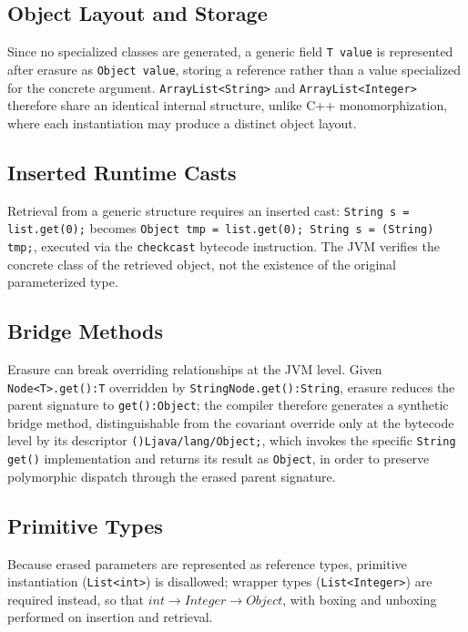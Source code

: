\documentclass[11pt]{report}
\begin{document}
\subsection{Object Layout and Storage}

Since no specialized classes are generated, a generic field \texttt{T value}
is represented after erasure as \texttt{Object value}, storing a reference
rather than a value specialized for the concrete argument.
\texttt{ArrayList<String>} and \texttt{ArrayList<Integer>} therefore share
an identical internal structure, unlike C++ monomorphization, where each
instantiation may produce a distinct object layout.

\subsection{Inserted Runtime Casts}

Retrieval from a generic structure requires an inserted cast:
\texttt{String s = list.get(0);} becomes \texttt{Object tmp = list.get(0);
String s = (String) tmp;}, executed via the \texttt{checkcast} bytecode
instruction. The JVM verifies the concrete class of the retrieved object,
not the existence of the original parameterized type.

\subsection{Bridge Methods}
\label{JavaGenerics:RuntimeRepresentation:BridgeMethods}

Erasure can break overriding relationships at the JVM level. Given
\texttt{Node<T>.get():T} overridden by \texttt{StringNode.get():String},
erasure reduces the parent signature to \texttt{get():Object}; the compiler
therefore generates a synthetic bridge method, distinguishable from the
covariant override only at the bytecode level by its descriptor
\texttt{()Ljava/lang/Object;}, which invokes the specific
\texttt{String get()} implementation and returns its result as
\texttt{Object}, in order to preserve polymorphic dispatch through the
erased parent signature.

\subsection{Primitive Types}

Because erased parameters are represented as reference types, primitive
instantiation (\texttt{List<int>}) is disallowed; wrapper types
(\texttt{List<Integer>}) are required instead, so that
$int \rightarrow Integer \rightarrow Object$, with boxing and unboxing
performed on insertion and retrieval.
\end{document}
